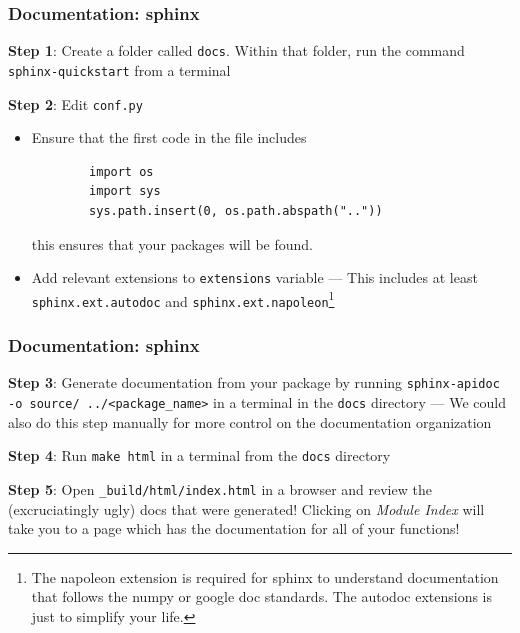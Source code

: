 \documentclass[10pt]{beamer}
\begin{document}
  \begin{frame}[fragile] \frametitle{Documentation: sphinx}

    \textbf{Step 1}: Create a folder called \texttt{docs}. Within that folder, run the
    command \texttt{sphinx-quickstart} from a terminal

    \vspace{0.25cm}

    \textbf{Step 2}: Edit \texttt{conf.py}
    \begin{itemize}
      \item Ensure that the first code in the file includes
        \begin{lstlisting}
        import os
        import sys
        sys.path.insert(0, os.path.abspath(".."))
        \end{lstlisting}
        this ensures that your packages will be found.
      \item Add relevant extensions to \texttt{extensions} variable ---
        This includes at least \texttt{sphinx.ext.autodoc} and
        \texttt{sphinx.ext.napoleon}\footnote{The napoleon extension is required for
        sphinx to understand documentation that follows the numpy or google doc
        standards. The autodoc extensions is just to simplify your life.}
    \end{itemize}

  \end{frame}

  \begin{frame} \frametitle{Documentation: sphinx}

     \textbf{Step 3}: Generate documentation from your package by running
     \texttt{sphinx-apidoc -o source/  ../<package\_name>} in a terminal in
     the \texttt{docs} directory --- We could also do this step manually for more control
     on the documentation organization

     \vspace{0.25cm}

     \textbf{Step 4}: Run \texttt{make html} in a terminal from the \texttt{docs}
     directory

     \vspace{0.25cm}

     \textbf{Step 5}: Open \texttt{\_build/html/index.html} in a browser and review the
     (excruciatingly ugly) docs that were generated! Clicking on \textit{Module Index}
     will take you to a page which has the documentation for all of your functions!

  \end{frame}
\end{document}
